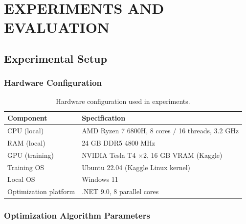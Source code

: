 \clearpage
{}
\chapter{EXPERIMENTS AND EVALUATION}
\label{chap:results}

\section{Experimental Setup}

\subsection{Hardware Configuration}

\begin{table}[H]
    \centering
    \caption{Hardware configuration used in experiments.}
    \label{tab:hardware}
    \begin{tabular}{ll}
        \toprule
        \textbf{Component}     & \textbf{Specification} \\
        \midrule
        CPU (local)            & AMD Ryzen 7 6800H, 8 cores / 16 threads, 3.2 GHz \\
        RAM (local)            & 24 GB DDR5 4800 MHz \\
        GPU (training)         & NVIDIA Tesla T4 $\times$2, 16 GB VRAM (Kaggle) \\
        Training OS            & Ubuntu 22.04 (Kaggle Linux kernel) \\
        Local OS               & Windows 11 \\
        Optimization platform  & .NET 9.0, 8 parallel cores \\
        \bottomrule
    \end{tabular}
\end{table}

\subsection{Optimization Algorithm Parameters}


